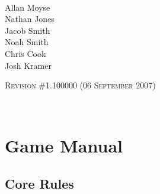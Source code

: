 \documentclass[twoside]{book}
\begin{document}
\begin{titlepage}
~\\~\\~\\~\\~\\~\\~\\~\\~\\~\\
\begin{center}
\ARPG \\

\hspace*{6em}
\vbox{\vspace{-2em}
\small Allan Moyse \\
Nathan Jones \\
Jacob Smith \\
Noah Smith \\
Chris Cook \\
Josh Kramer}

\vskip 2in
\textsc{Revision \#1.100000 (06 September 2007)}
\end{center}

\end{titlepage}

~
\setcounter{page}{1}
\setcounter{tocdepth}{3}
\tableofcontents
\newpage
\listoftables
\newpage
\listoffigures
\newpage
{}
\setcounter{page}{1}


  
    

\part{Game Manual}
    
    

\chapter{Core Rules}
    
    
\end{document}
